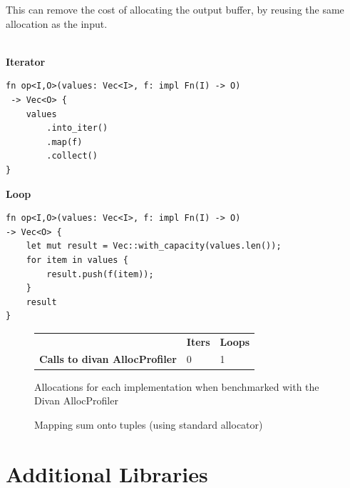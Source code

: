 This can remove the cost of allocating the output buffer, by reusing the same allocation as the input.
\\
\\ \begin{minipage}{.5\textwidth}
    \textbf{Iterator}
    \begin{verbatim}
fn op<I,O>(values: Vec<I>, f: impl Fn(I) -> O)
 -> Vec<O> {
    values
        .into_iter()
        .map(f)
        .collect()
}

    \end{verbatim}
\end{minipage} \hfill \begin{minipage}{.5\textwidth}
    \textbf{Loop}
    \begin{verbatim}
fn op<I,O>(values: Vec<I>, f: impl Fn(I) -> O) 
-> Vec<O> {
    let mut result = Vec::with_capacity(values.len());
    for item in values {
        result.push(f(item));
    }
    result
}
    \end{verbatim}
\end{minipage}
\begin{figure}[h!]
    \centering
    \begin{tabular}{l l l}
                                              & \textbf{Iters} & \textbf{Loops} \\
        \textbf{Calls to divan AllocProfiler} & 0              & 1              \\
    \end{tabular}
    \caption{Allocations for each implementation when benchmarked with the Divan AllocProfiler}
\end{figure}
\begin{figure}[h!]
    \centering
    \vspace{-0.4em}
    \resizebox{\textwidth}{!}{}
    \caption{Mapping sum onto tuples (using standard allocator)}
\end{figure}

\section{Additional Libraries}
